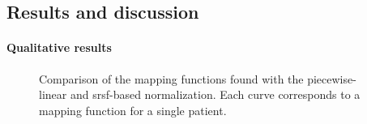\subsection{Results and discussion}

\paragraph{Qualitative results}


\begin{figure}
  \hspace*{\fill}
  \hfill
  \hspace*{\fill}
  \caption[Comparison of the mapping functions found with the piecewise-linear and \acs{srsf}-based normalization.]{Comparison of the mapping functions found with the piecewise-linear and \acs{srsf}-based normalization. Each curve corresponds to a mapping function for a single patient.}
  \label{fig:mapping}
\end{figure}


